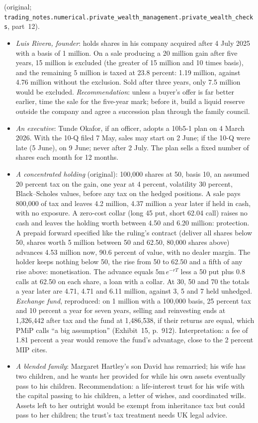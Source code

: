 \begin{qfmethod}
 (original; \nolinkurl{trading_notes.numerical.private_wealth_management.private_wealth_checks}, part~12).
\begin{itemize}
\item \emph{Luis Rivera, founder}: holds shares in his company acquired after 4 July 2025 with a basis of 1 million. On a sale producing a 20 million gain after five years, 15 million is excluded (the greater of 15 million and 10 times basis), and the remaining 5 million is taxed at 23.8 percent: 1.19 million, against 4.76 million without the exclusion. Sold after three years, only 7.5 million would be excluded. \emph{Recommendation}: unless a buyer's offer is far better earlier, time the sale for the five-year mark; before it, build a liquid reserve outside the company and agree a succession plan through the family council.
\item \emph{An executive}: Tunde Okafor, if an officer, adopts a 10b5-1 plan on 4 March 2026. With the 10-Q filed 7 May, sales may start on 2 June; if the 10-Q were late (5 June), on 9 June; never after 2 July. The plan sells a fixed number of shares each month for 12 months.
\item \emph{A concentrated holding} (original): 100{,}000 shares at 50, basis 10, an assumed 20 percent tax on the gain, one year at 4 percent, volatility 30 percent, Black--Scholes values, before any tax on the hedged positions. A sale pays 800{,}000 of tax and leaves 4.2 million, 4.37 million a year later if held in cash, with no exposure. A zero-cost collar (long 45 put, short 62.04 call) raises no cash and leaves the holding worth between 4.50 and 6.20 million: protection. A prepaid forward specified like the ruling's contract (deliver all shares below 50, shares worth 5 million between 50 and 62.50, 80{,}000 shares above) advances 4.53 million now, 90.6 percent of value, with no dealer margin. The holder keeps nothing below 50, the rise from 50 to 62.50 and a fifth of any rise above: monetisation. The advance equals $5\text{m}\,e^{-rT}$ less a 50 put plus 0.8 calls at 62.50 on each share, a loan with a collar. At 30, 50 and 70 the totals a year later are 4.71, 4.71 and 6.11 million, against 3, 5 and 7 held unhedged. \emph{Exchange fund}, reproduced: on 1 million with a 100{,}000 basis, 25 percent tax and 10 percent a year for seven years, selling and reinvesting ends at 1{,}326{,}442 after tax and the fund at 1{,}486{,}538, if their returns are equal, which PMiP calls ``a big assumption'' (Exhibit~15, p.~912). Interpretation: a fee of 1.81 percent a year would remove the fund's advantage, close to the 2 percent MIP cites.
\item \emph{A blended family}: Margaret Hartley's son David has remarried; his wife has two children, and he wants her provided for while his own assets eventually pass to his children. Recommendation: a life-interest trust for his wife with the capital passing to his children, a letter of wishes, and coordinated wills. Assets left to her outright would be exempt from inheritance tax but could pass to her children; the trust's tax treatment needs UK legal advice.
\end{itemize}


\end{qfmethod}
